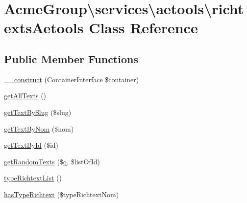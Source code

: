 \hypertarget{class_acme_group_1_1services_1_1aetools_1_1richtexts_aetools}{\section{Acme\+Group\textbackslash{}services\textbackslash{}aetools\textbackslash{}richtexts\+Aetools Class Reference}
\label{class_acme_group_1_1services_1_1aetools_1_1richtexts_aetools}
}
\subsection*{Public Member Functions}
\begin{DoxyCompactItemize}
\item 
\hyperlink{class_acme_group_1_1services_1_1aetools_1_1richtexts_aetools_a74088a559e2f76691c57bbdb7f29e84b}{\+\_\+\+\_\+construct} (Container\+Interface \$container)
\item 
\hyperlink{class_acme_group_1_1services_1_1aetools_1_1richtexts_aetools_ac9338c6da1fe795daf5f55f12cc70e13}{get\+All\+Texts} ()
\item 
\hyperlink{class_acme_group_1_1services_1_1aetools_1_1richtexts_aetools_abb5be0c1f107a4f218c57d7610c82417}{get\+Text\+By\+Slug} (\$slug)
\item 
\hyperlink{class_acme_group_1_1services_1_1aetools_1_1richtexts_aetools_a1e9658f478bb197940be6218a699edb0}{get\+Text\+By\+Nom} (\$nom)
\item 
\hyperlink{class_acme_group_1_1services_1_1aetools_1_1richtexts_aetools_a23a90ebea963a43f205840310ec86da1}{get\+Text\+By\+Id} (\$id)
\item 
\hyperlink{class_acme_group_1_1services_1_1aetools_1_1richtexts_aetools_a51ab2719e94b4c2d0cc235a6f1d3903f}{get\+Random\+Texts} (\$\hyperlink{_fixed_columns_8min_8js_a53e2359402d7f3765cf1cda82ee7c11b}{q}, \$list\+Of\+Id)
\item 
\hyperlink{class_acme_group_1_1services_1_1aetools_1_1richtexts_aetools_a1c9662f6d50f6f78b77ebd2b53b4bd87}{type\+Richtext\+List} ()
\item 
\hyperlink{class_acme_group_1_1services_1_1aetools_1_1richtexts_aetools_a7e58f16a713eebf24eb0c40887653178}{has\+Type\+Richtext} (\$type\+Richtext\+Nom)
\end{DoxyCompactItemize}


